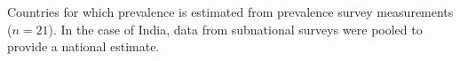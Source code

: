 \label{fig:ps}Countries for which prevalence is estimated from prevalence survey measurements ($n=21$). In the case of India, data from subnational surveys were pooled to provide a national estimate.
